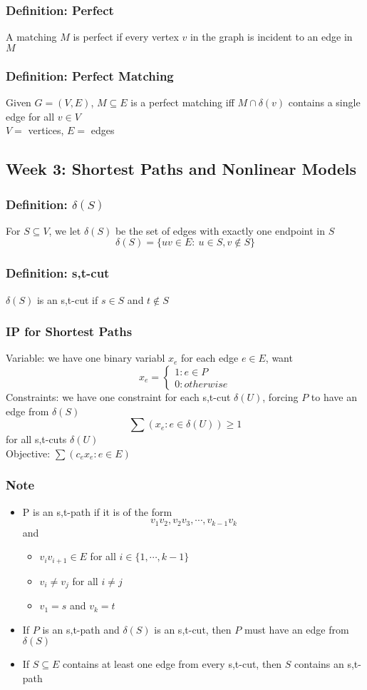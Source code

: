 \documentclass[11pt]{article}
\begin{document}
\subsubsection{Definition: Perfect}
A matching $M$ is perfect if every vertex $v$ in the graph is incident to an edge in $M$
\subsubsection{Definition: Perfect Matching}
Given $G=(V,E)$, $M\subseteq E$ is a perfect matching iff $M\cap\delta(v)$ contains a single edge for all $v\in V$ \\
$V = $ vertices, $E = $ edges
\subsection{Week 3: Shortest Paths and Nonlinear Models}
\subsubsection{Definition: $\delta(S)$}
For $S\subseteq V$, we let $\delta(S)$ be the set of edges with exactly one endpoint in $S$ \[\delta(S)=\{uv\in E:\ u\in S, v\notin S\}\]
\subsubsection{Definition: s,t-cut}
$\delta(S)$ is an s,t-cut if $s\in S$ and $t\notin S$
\subsubsection{IP for Shortest Paths}
Variable: we have one binary variabl $x_e$ for each edge $e\in E$, want 
\begin{equation*}
  x_e=
  \begin{cases}
    1: e\in P \\
    0: otherwise
  \end{cases}
\end{equation*}
Constraints: we have one constraint for each s,t-cut $\delta(U)$, forcing $P$ to have an edge from $\delta(S)$
\[\sum(x_e: e\in\delta(U))\geq 1\]
for all s,t-cuts $\delta(U)$ \\
Objective: $\displaystyle\sum(c_ex_e: e\in E)$
\subsubsection*{Note}
\begin{itemize}
  \item P is an s,t-path if it is of the form \[v_1v_2, v_2v_3, \cdots, v_{k-1}v_k\] and 
  \begin{itemize}
    \item $v_iv_{i+1}\in E$ for all $i\in\{1,\cdots,k-1\}$
    \item $v_i\neq v_j$ for all $i\neq j$
    \item $v_1=s$ and $v_k=t$
  \end{itemize}
  \item If $P$ is an s,t-path and $\delta(S)$ is an s,t-cut, then $P$ must have an edge from $\delta(S)$
  \item If $S\subseteq E$ contains at least one edge from every s,t-cut, then $S$ contains an s,t-path 
\end{itemize}
\end{document}
